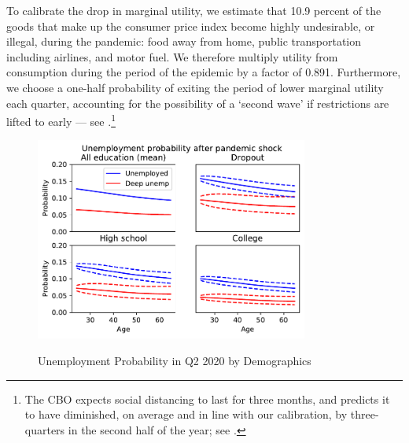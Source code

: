 To calibrate the drop in marginal utility, we estimate that 10.9 percent of the goods that make up the consumer price index become highly undesirable, or illegal, during the pandemic: food away from home, public transportation including airlines, and motor fuel.
We therefore multiply utility from consumption during the period of the epidemic by a factor of 0.891.
Furthermore, we choose a one-half probability of exiting the period of lower marginal utility each quarter, accounting for the possibility of a `second wave' if restrictions are lifted to early --- see \cite{cyranoski_we_2020}.\footnote{The CBO expects social distancing to last for three months, and predicts it to have diminished, on average and in line with our calibration, by three-quarters in the second half of the year; see \cite{SwagelCBO2020}.}

\begin{figure}
	\centering
	\caption{Unemployment Probability in Q2 2020 by Demographics}
	\label{unemployment_demographics}
	{ \includegraphics[width=0.8\textwidth]{./Figures/UnempProbByDemogBasic}}
\end{figure}


